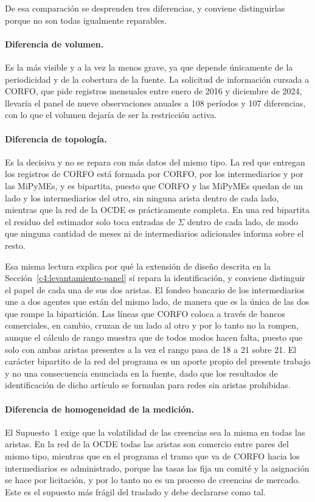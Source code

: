 De esa comparación se desprenden tres diferencias, y conviene distinguirlas porque no son todas igualmente reparables.

\paragraph{Diferencia de volumen.} Es la más visible y a la vez la menos grave, ya que depende únicamente de la periodicidad y de la cobertura de la fuente. La solicitud de información cursada a CORFO, que pide registros mensuales entre enero de 2016 y diciembre de 2024, llevaría el panel de nueve observaciones anuales a 108 períodos y 107 diferencias, con lo que el volumen dejaría de ser la restricción activa.

\paragraph{Diferencia de topología.} Es la decisiva y no se repara con más datos del mismo tipo. La red que entregan los registros de CORFO está formada por CORFO, por los intermediarios y por las MiPyMEs, y es bipartita, puesto que CORFO y las MiPyMEs quedan de un lado y los intermediarios del otro, sin ninguna arista dentro de cada lado, mientras que la red de la OCDE es prácticamente completa. En una red bipartita el residuo del estimador solo toca entradas de $\Sigma$ dentro de cada lado, de modo que ninguna cantidad de meses ni de intermediarios adicionales informa sobre el resto.

Esa misma lectura explica por qué la extensión de diseño descrita en la Sección~\ref{c4:levantamiento-panel} sí repara la identificación, y conviene distinguir el papel de cada una de sus dos aristas. El fondeo bancario de los intermediarios une a dos agentes que están del mismo lado, de manera que es la única de las dos que rompe la bipartición. Las líneas que CORFO coloca a través de bancos comerciales, en cambio, cruzan de un lado al otro y por lo tanto no la rompen, aunque el cálculo de rango muestra que de todos modos hacen falta, puesto que solo con ambas aristas presentes a la vez el rango pasa de 18 a 21 sobre 21. El carácter bipartito de la red del programa es un aporte propio del presente trabajo y no una consecuencia enunciada en la fuente, dado que los resultados de identificación de dicho artículo se formulan para redes sin aristas prohibidas.

\paragraph{Diferencia de homogeneidad de la medición.} El Supuesto~1 exige que la volatilidad de las creencias sea la misma en todas las aristas. En la red de la OCDE todas las aristas son comercio entre pares del mismo tipo, mientras que en el programa el tramo que va de CORFO hacia los intermediarios es administrado, porque las tasas las fija un comité y la asignación se hace por licitación, y por lo tanto no es un proceso de creencias de mercado. Este es el supuesto más frágil del traslado y debe declararse como tal.

